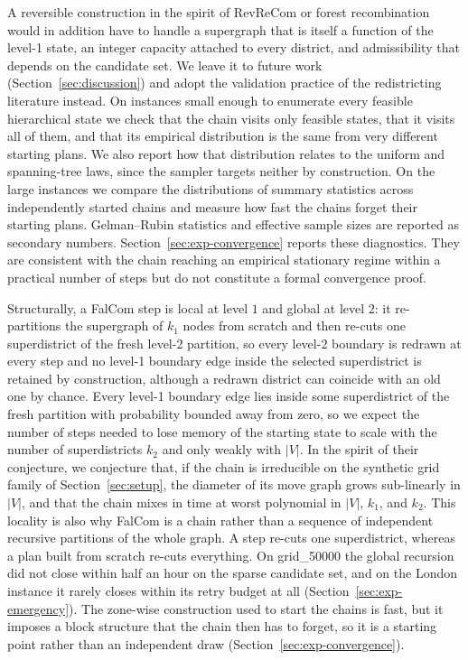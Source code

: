 \documentclass[11pt]{article}
\theoremstyle{definition}
\begin{document}
A reversible construction in the spirit of RevReCom or forest recombination would in addition have to handle a supergraph that is itself a function of the level-1 state, an integer capacity attached to every district, and admissibility that depends on the candidate set. We leave it to future work (Section~\ref{sec:discussion}) and adopt the validation practice of the redistricting literature instead. On instances small enough to enumerate every feasible hierarchical state we check that the chain visits only feasible states, that it visits all of them, and that its empirical distribution is the same from very different starting plans. We also report how that distribution relates to the uniform and spanning-tree laws, since the sampler targets neither by construction. On the large instances we compare the distributions of summary statistics across independently started chains and measure how fast the chains forget their starting plans. Gelman--Rubin statistics and effective sample sizes are reported as secondary numbers. Section~\ref{sec:exp-convergence} reports these diagnostics. They are consistent with the chain reaching an empirical stationary regime within a practical number of steps but do not constitute a formal convergence proof.


Structurally, a FalCom step is local at level $1$ and global at level $2$: it re-partitions the supergraph of $k_1$ nodes from scratch and then re-cuts one superdistrict of the fresh level-2 partition, so every level-2 boundary is redrawn at every step and no level-1 boundary edge inside the selected superdistrict is retained by construction, although a redrawn district can coincide with an old one by chance. Every level-1 boundary edge lies inside some superdistrict of the fresh partition with probability bounded away from zero, so we expect the number of steps needed to lose memory of the starting state to scale with the number of superdistricts $k_2$ and only weakly with $|V|$. In the
spirit of their conjecture, we conjecture that, if the chain is irreducible on the synthetic grid family of Section~\ref{sec:setup}, the diameter of its move graph grows sub-linearly in $|V|$, and that the
chain mixes in time at worst polynomial in $|V|$, $k_1$, and $k_2$. This locality is also why FalCom is a chain rather than a sequence of independent recursive partitions of the whole graph. A step re-cuts one superdistrict, whereas a plan built from scratch re-cuts everything. On grid\_50000 the global recursion did not close within half an hour on the sparse candidate set, and on the London instance it rarely closes within its retry budget at all (Section~\ref{sec:exp-emergency}). The zone-wise construction used to start the chains is fast, but it imposes a block structure that the chain then has to forget, so it is a starting point rather than an independent draw (Section~\ref{sec:exp-convergence}). 
\end{document}
